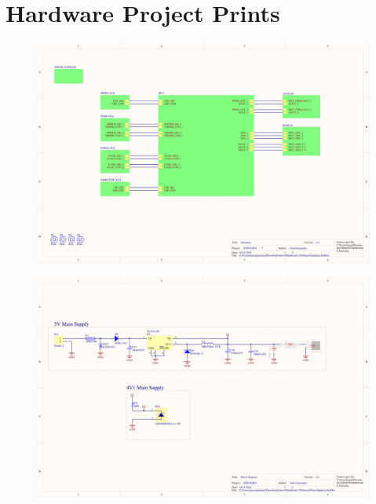 \chapter{Hardware Project Prints}\label{ch:hw-proj-appendix}

	\begin{figure}[htbp]
		\centering
		\includegraphics[width=1.5\textwidth, angle=270]{figuras/fig-schematic-1}
	\end{figure}

	\begin{figure}[htbp]
		\centering
		\includegraphics[width=1.5\textwidth, angle=270]{figuras/fig-schematic-2}
	\end{figure}

